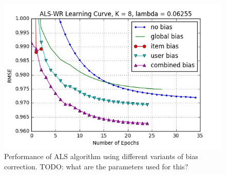 \begin{figure}[htbp]
  \centering
  \includegraphics[width=.7\columnwidth]{figures/bias.jpg}
  \vspace{-3mm}
  \caption{Performance of ALS algorithm using different variants of bias
  correction. TODO: what are the parameters used for this? }
  \label{fig:bias}
\end{figure}
